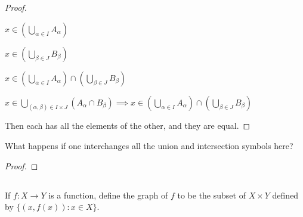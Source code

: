 \documentclass[../../main.tex]{subfiles}
\begin{document}
\begin{proof}
\begin{lxl}[resume]
\begin{lxl}
\begin{lxl}
            \end{lxl}
                \item $x \in (\bigcup_{\alpha \in I} A_{\alpha})$
                \item $x \in (\bigcup_{\beta \in J} B_{\beta})$
                \item $x \in (\bigcup_{\alpha \in I} A_{\alpha}) \cap (\bigcup_{\beta \in J} B_{\beta})$
        \end{lxl}
        \item $x \in \bigcup_{(\alpha, \beta) \in I \times J} (A_{\alpha} \cap B_{\beta}) \implies x \in (\bigcup_{\alpha \in I} A_{\alpha}) \cap (\bigcup_{\beta \in J} B_{\beta})$ 
    \end{lxl}
    Then each has all the elements of the other, and they are equal.
\end{proof}
\begin{xx}
    
\end{xx}
        
\begin{q}
    What happens if one interchanges all the union and intersection symbols here?
\end{q}

\begin{ans}
    
\end{ans}
    
\begin{proof}
    
\end{proof}
\begin{xx}
    
\end{xx}

\subsection{}
\begin{q}
    If $f : X \to Y$ is a function, define the graph of $f$ to be the subset of $X \times Y$ defined by $\{(x, f(x)) : x \in X\}$.
\end{q}
\end{document}
